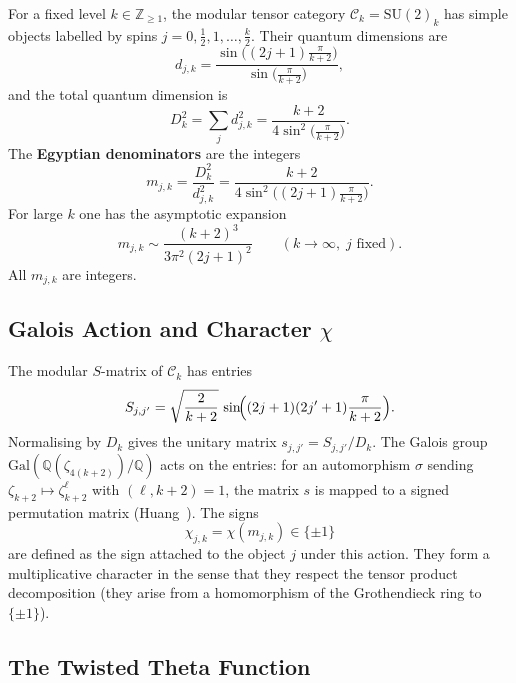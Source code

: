 \documentclass[11pt,a4paper]{article}
\theoremstyle{remark}
\begin{document}
For a fixed level \(k\in\mathbb{Z}_{\ge 1}\), the modular tensor category \(\mathcal{C}_k=\mathrm{SU}(2)_k\) has simple objects labelled by spins \(j=0,\frac12,1,\dots,\frac{k}{2}\).
Their quantum dimensions are
\begin{equation}\label{eq:qdim}
d_{j,k}= \frac{\sin\!\bigl((2j+1)\frac{\pi}{k+2}\bigr)}{\sin\!\bigl(\frac{\pi}{k+2}\bigr)},
\end{equation}
and the total quantum dimension is
\begin{equation}\label{eq:D2}
D_k^2 = \sum_{j} d_{j,k}^2 = \frac{k+2}{4\sin^2\!\bigl(\frac{\pi}{k+2}\bigr)}.
\end{equation}
The \textbf{Egyptian denominators} are the integers
\begin{equation}\label{eq:m}
m_{j,k} = \frac{D_k^2}{d_{j,k}^2}
        = \frac{k+2}{4\sin^2\!\bigl((2j+1)\frac{\pi}{k+2}\bigr)}.
\end{equation}
For large \(k\) one has the asymptotic expansion
\begin{equation}\label{eq:masympt}
m_{j,k} \sim \frac{(k+2)^3}{3\pi^2(2j+1)^2} \qquad (k\to\infty,\;j\text{ fixed}).
\end{equation}
All \(m_{j,k}\) are integers.

\subsection{Galois Action and Character \(\chi\)}

The modular \(S\)-matrix of \(\mathcal{C}_k\) has entries
\[
S_{j,j'} = \sqrt{\frac{2}{k+2}}\, \sin\!\Bigl((2j+1)(2j'+1)\frac{\pi}{k+2}\Bigr).
\]
Normalising by \(D_k\) gives the unitary matrix \(s_{j,j'}=S_{j,j'}/D_k\).
The Galois group \(\mathrm{Gal}(\mathbb{Q}(\zeta_{4(k+2)})/\mathbb{Q})\) acts on the entries: for an automorphism \(\sigma\) sending \(\zeta_{k+2}\mapsto\zeta_{k+2}^\ell\) with \((\ell,k+2)=1\), the matrix \(s\) is mapped to a signed permutation matrix (Huang~\cite{huang2019}).
The signs
\[
\chi_{j,k}=\chi(m_{j,k})\in\{\pm1\}
\]
are defined as the sign attached to the object \(j\) under this action.
They form a multiplicative character in the sense that they respect the tensor product decomposition (they arise from a homomorphism of the Grothendieck ring to \(\{\pm1\}\)).

\subsection{The Twisted Theta Function}
\end{document}
